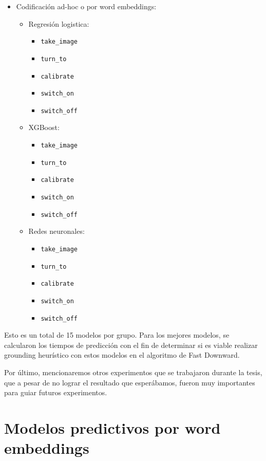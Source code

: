 \begin{itemize}
    \item Codificación ad-hoc o por word embeddings:
    \begin{itemize}
        \item Regresión logistica:
        \begin{itemize}
            \item \verb|take_image|
            \item \verb|turn_to|
            \item \verb|calibrate|
            \item \verb|switch_on|
            \item \verb|switch_off|
        \end{itemize}
        \item XGBoost:
        \begin{itemize}
            \item \verb|take_image|
            \item \verb|turn_to|
            \item \verb|calibrate|
            \item \verb|switch_on|
            \item \verb|switch_off|
        \end{itemize}
        \item Redes neuronales:
        \begin{itemize}
            \item \verb|take_image|
            \item \verb|turn_to|
            \item \verb|calibrate|
            \item \verb|switch_on|
            \item \verb|switch_off|
        \end{itemize}
    \end{itemize}
\end{itemize}

Esto es un total de 15 modelos por grupo. Para los mejores modelos, se
calcularon los tiempos de predicción con el fin de determinar si es viable
realizar grounding heurístico con estos modelos en el algoritmo de Fast
Downward.

Por último, mencionaremos otros experimentos que se trabajaron durante la tesis,
que a pesar de no lograr el resultado que esperábamos, fueron muy importantes
para guiar futuros experimentos.

\section{Modelos predictivos por word embeddings}
\label{exp:ad-hoc}

